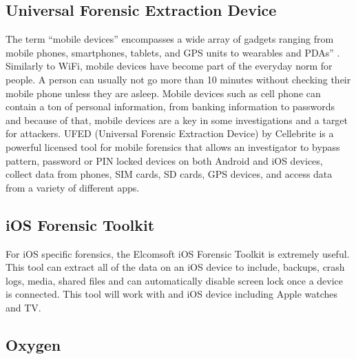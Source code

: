 \documentclass[acmlarge]{acmart}
\begin{document}
\subsection{Universal Forensic Extraction Device}

The term “mobile devices” encompasses a wide array of gadgets ranging from mobile phones, smartphones, tablets, and GPS units to wearables and PDAs” \cite{Kostadinov_2019}. Similarly to WiFi, mobile devices have become part of the everyday norm for people. A person can usually not go more than 10 minutes without checking their mobile phone unless they are asleep. Mobile devices such as cell phone can contain a ton of personal information, from banking information to passwords and because of that, mobile devices are a key in some investigations and a target for attackers. 
UFED (Universal Forensic Extraction Device) by Cellebrite is a powerful licensed tool for mobile forensics that allows an investigator to bypass pattern, password or PIN locked devices on both Android and iOS devices, collect data from phones, SIM cards, SD cards, GPS devices, and access data from a variety of different apps. 


\subsection{iOS Forensic Toolkit}

For iOS specific forensics, the Elcomsoft iOS Forensic Toolkit is extremely useful. This tool can extract all of the data on an iOS device to include, backups, crash logs, media, shared files and can automatically disable screen lock once a device is connected. This tool will work with and iOS device including Apple watches and TV. %


\subsection{Oxygen}
\end{document}
